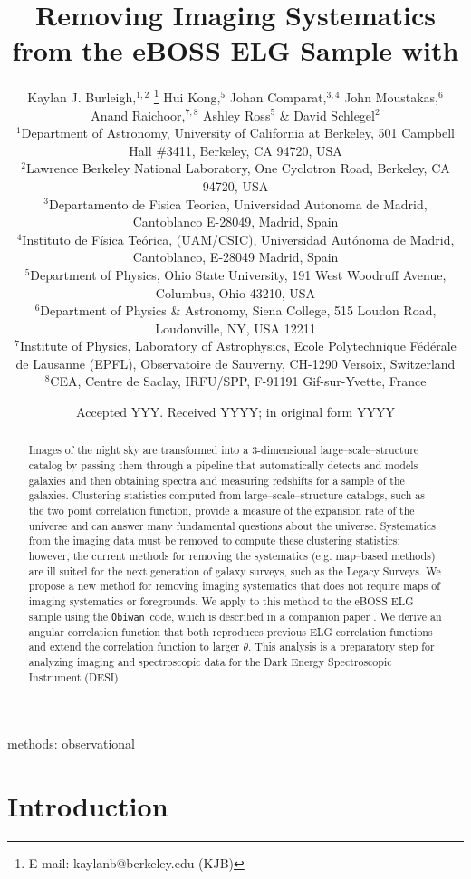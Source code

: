 \documentclass[a4paper,fleqn,usenatbib]{mnras}
\title[Removing Imaging Systematics with \obiwan]{Removing Imaging Systematics from the eBOSS ELG Sample with \obiwan}
\author[K. J. Burleigh]{
Kaylan J. Burleigh,$^{1,2}$ \thanks{E-mail: kaylanb@berkeley.edu (KJB)}
Hui Kong,$^{5}$
Johan Comparat,$^{3,4}$
John Moustakas,$^{6}$ 
\newauthor
Anand Raichoor,$^{7,8}$
Ashley Ross$^{5}$
\& David Schlegel$^{2}$
\\
$^{1}$Department of Astronomy, University of California at Berkeley, 501 Campbell Hall \#3411, Berkeley, CA 94720, USA\\
$^{2}$Lawrence Berkeley National Laboratory, One Cyclotron Road, Berkeley, CA 94720, USA\\
$^{3}$Departamento de Fisica Teorica, Universidad Autonoma de Madrid, Cantoblanco E-28049, Madrid, Spain \\
$^{4}$Instituto de F\'{i}sica Te\'{o}rica, (UAM/CSIC), Universidad Aut\'{o}noma de Madrid, Cantoblanco, E-28049 Madrid, Spain \\
$^{5}$Department of Physics, Ohio State University, 191 West Woodruff Avenue, Columbus, Ohio 43210, USA \\ 
$^{6}$Department of Physics \& Astronomy, Siena College, 515 Loudon Road, Loudonville, NY, USA 12211 \\
$^{7}$Institute of Physics, Laboratory of Astrophysics, Ecole Polytechnique F\'{e}d\'{e}rale de Lausanne (EPFL), Observatoire de Sauverny, CH-1290 Versoix, Switzerland \\
$^{8}$CEA, Centre de Saclay, IRFU/SPP, F-91191 Gif-sur-Yvette, France \\
}
\date{Accepted YYY. Received YYYY; in original form YYYY}
\newcommand{\obiwan}{{\tt Obiwan}}
\begin{document}
\label{firstpage}
\pagerange{\pageref{firstpage}--\pageref{lastpage}}
\maketitle

\begin{abstract}
Images of the night sky are transformed into a 3-dimensional large--scale--structure catalog by passing them through a pipeline that automatically detects and models galaxies and then obtaining spectra and measuring redshifts for a sample of the galaxies. Clustering statistics computed from large--scale--structure catalogs, such as the two point correlation function, provide a measure of the expansion rate of the universe and can answer many fundamental questions about the universe. Systematics from the imaging data must be removed to compute these clustering statistics; however, the current methods for removing the systematics (e.g. map--based methods) are ill suited for the next generation of galaxy surveys, such as the Legacy Surveys. We propose a new method for removing imaging systematics that does not require maps of imaging systematics or foregrounds. We apply to this method to the eBOSS ELG sample using the \obiwan\, code, which is described in a companion paper \cite{obiwanMethods}. We derive an angular correlation function that both reproduces previous ELG correlation functions \citep{corrfuncEboss} and extend the correlation function to larger $\theta$. This analysis is a preparatory step for analyzing imaging and spectroscopic data for the Dark Energy Spectroscopic Instrument (DESI).
\end{abstract}

\begin{keywords}
methods: observational
\end{keywords}



\section{Introduction}
\end{document}
